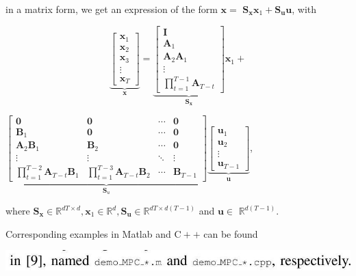 \documentclass[10pt]{article}
\begin{document}
in a matrix form, we get an expression of the form $\boldsymbol{x}=$ $\boldsymbol{S}_{\boldsymbol{x}} \boldsymbol{x}_{1}+\boldsymbol{S}_{\boldsymbol{u}} \boldsymbol{u}$, with

$$
\underbrace{\left[\begin{array}{c}
\boldsymbol{x}_{1} \\
\boldsymbol{x}_{2} \\
\boldsymbol{x}_{3} \\
\vdots \\
\boldsymbol{x}_{T}
\end{array}\right]}_{\boldsymbol{x}}=\underbrace{\left[\begin{array}{c}
\boldsymbol{I} \\
\boldsymbol{A}_{1} \\
\boldsymbol{A}_{2} \boldsymbol{A}_{1} \\
\vdots \\
\prod_{t=1}^{T-1} \boldsymbol{A}_{T-t}
\end{array}\right]}_{\boldsymbol{S}_{\boldsymbol{x}}} \boldsymbol{x}_{1}+
$$

$\underbrace{\left[\begin{array}{cccc}\mathbf{0} & \mathbf{0} & \cdots & \mathbf{0} \\ \boldsymbol{B}_{1} & \mathbf{0} & \cdots & \mathbf{0} \\ \boldsymbol{A}_{2} \boldsymbol{B}_{1} & \boldsymbol{B}_{2} & \cdots & \mathbf{0} \\ \vdots & \vdots & \ddots & \vdots \\ \prod_{t=1}^{T-2} \boldsymbol{A}_{T-t} \boldsymbol{B}_{1} & \prod_{t=1}^{T-3} \boldsymbol{A}_{T-t} \boldsymbol{B}_{2} & \cdots & \boldsymbol{B}_{T-1}\end{array}\right]}_{\boldsymbol{S}_{u}} \underbrace{\left[\begin{array}{c}\boldsymbol{u}_{1} \\ \boldsymbol{u}_{2} \\ \vdots \\ \boldsymbol{u}_{T-1}\end{array}\right]}_{\boldsymbol{u}}$,

where $\boldsymbol{S}_{\boldsymbol{x}} \in \mathbb{R}^{d T \times d}, \boldsymbol{x}_{1} \in \mathbb{R}^{d}, \boldsymbol{S}_{\boldsymbol{u}} \in \mathbb{R}^{d T \times d(T-1)}$ and $\boldsymbol{u} \in$ $\mathbb{R}^{d(T-1)}$.

Corresponding examples in Matlab and $\mathrm{C}++$ can be found

\begin{center}
\includegraphics[max width=\textwidth]{2023_01_25_b4240e152b7ba97a594cg-12}
\end{center}
\end{document}
